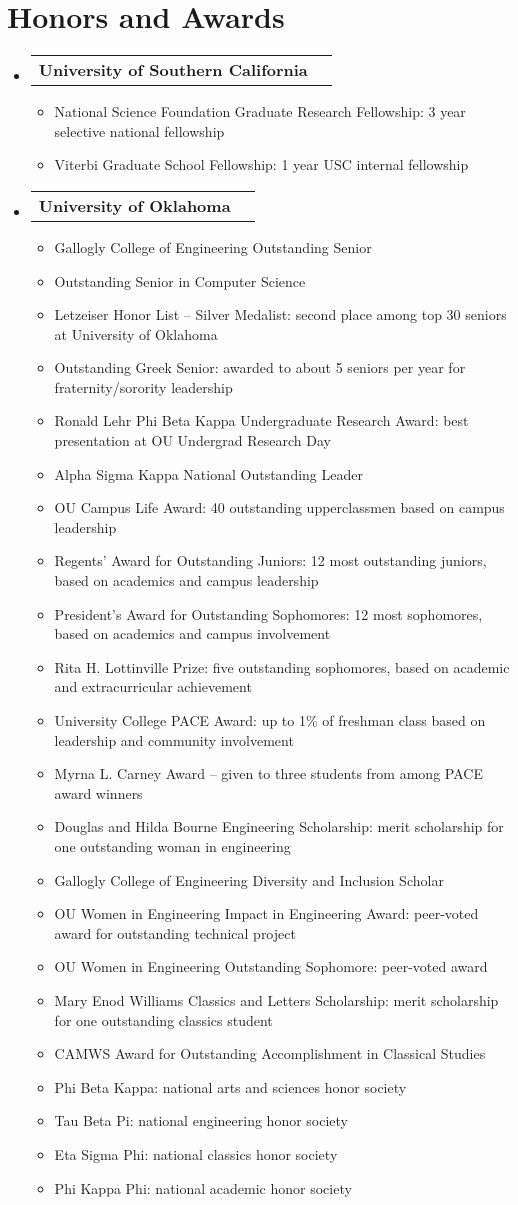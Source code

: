 \documentclass[letterpaper,11pt]{article}
\makeatletter
\newcommand{\resumeItem}[1]{
  \item\small{
  {#1 \vspace{-2pt}}
  }
}
\newcommand{\resumeSubheadingNoTitle}[1]{
  \vspace{-1pt} \item
    \begin{tabular*}{0.97\textwidth}{l@{\extracolsep{\fill}}r}
      \textbf{#1} & \\
    \end{tabular*}\vspace{-5pt}
}
\newcommand{\resumeSubHeadingListStart}{\begin{itemize}[label={}, leftmargin=*]}
\newcommand{\resumeSubHeadingListEnd}{\end{itemize}}
\newcommand{\resumeItemListStart}{\begin{itemize}}
\newcommand{\resumeItemListEnd}{\end{itemize}\vspace{-5pt}}
\makeatother
\begin{document}
\section{Honors and Awards}
 \resumeSubHeadingListStart
 \resumeSubheadingNoTitle{University of Southern California}
 \resumeItemListStart
   \resumeItem{National Science Foundation Graduate Research Fellowship: 3 year selective national fellowship}
   \resumeItem{Viterbi Graduate School Fellowship: 1 year USC internal fellowship}
\resumeItemListEnd
\resumeSubheadingNoTitle{University of Oklahoma}
\resumeItemListStart
   \resumeItem{Gallogly College of Engineering Outstanding Senior}
   \resumeItem{Outstanding Senior in Computer Science}
   \resumeItem{Letzeiser Honor List – Silver Medalist: second place among top 30 seniors at University of Oklahoma}
   \resumeItem{Outstanding Greek Senior: awarded to about 5 seniors per year for fraternity/sorority leadership}
   \resumeItem{Ronald Lehr Phi Beta Kappa Undergraduate Research Award: best presentation at OU Undergrad Research Day}
   \resumeItem{Alpha Sigma Kappa National Outstanding Leader}
   \resumeItem{OU Campus Life Award: 40 outstanding upperclassmen based on campus leadership}
   \resumeItem{Regents' Award for Outstanding Juniors: 12 most outstanding juniors, based on academics and campus leadership}
   \resumeItem{President’s Award for Outstanding Sophomores: 12 most sophomores, based on academics and campus involvement}
   \resumeItem{Rita H. Lottinville Prize: five outstanding sophomores, based on academic and extracurricular achievement}
   \resumeItem{University College PACE Award: up to 1\% of freshman class based on leadership and community involvement}
   \resumeItem{Myrna L. Carney Award – given to three students from among PACE award winners}
   \resumeItem{Douglas and Hilda Bourne Engineering Scholarship: merit scholarship for one outstanding woman in engineering}
   \resumeItem{Gallogly College of Engineering Diversity and Inclusion Scholar}
   \resumeItem{OU Women in Engineering Impact in Engineering Award: peer-voted award for outstanding technical project}
   \resumeItem{OU Women in Engineering Outstanding Sophomore: peer-voted award}
   \resumeItem{Mary Enod Williams Classics and Letters Scholarship: merit scholarship for one outstanding classics student}
   \resumeItem{CAMWS Award for Outstanding Accomplishment in Classical Studies}
   \resumeItem{Phi Beta Kappa: national arts and sciences honor society}
   \resumeItem{Tau Beta Pi: national engineering honor society}
   \resumeItem{Eta Sigma Phi: national classics honor society}
   \resumeItem{Phi Kappa Phi: national academic honor society}
\resumeItemListEnd
 \resumeSubHeadingListEnd
\end{document}
